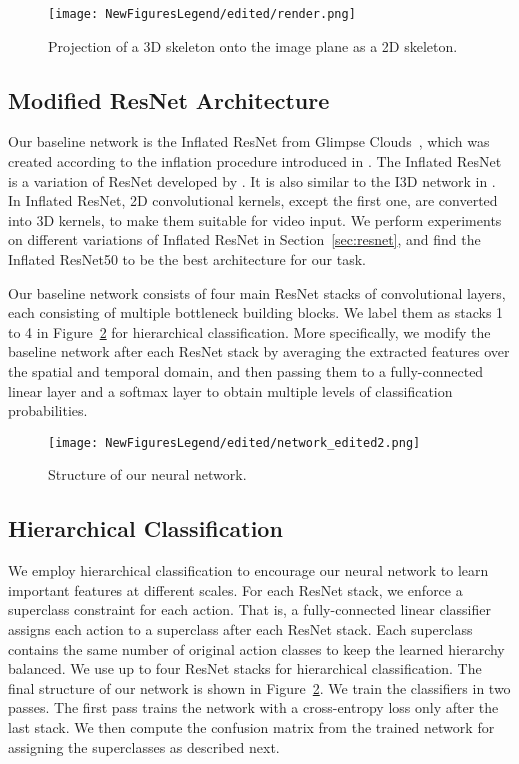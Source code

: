 \documentclass{article}
\begin{document}
 

 

\begin{figure}[tb]
\centering
\texttt{[image: NewFiguresLegend/edited/render.png]}
\caption{Projection of a 3D skeleton onto the image plane as a 2D skeleton.}
\label{fig:projection}
\end{figure}

\subsection{Modified ResNet Architecture}
\label{sec:network}

{Our baseline network is the Inflated ResNet from Glimpse Clouds~\cite{Baradel_2018}, which was created according to the inflation procedure introduced in \cite{carreira2017quo}. The Inflated ResNet is a variation of ResNet developed by \cite{He_2016}. It is also similar to the I3D network in \cite{zhu2018action}. In Inflated ResNet, 2D convolutional kernels, except the first one, are converted into 3D kernels, to make them suitable for video input. We perform experiments on different variations of Inflated ResNet in Section~\ref{sec:resnet}, and find the Inflated ResNet50 to be the best architecture for our task.} 





{Our baseline network consists of four main ResNet stacks of convolutional layers, each consisting of multiple bottleneck building blocks. We label them as stacks 1 to 4 in Figure~\ref{fig:network} for hierarchical classification. More specifically, we modify the baseline network after each ResNet stack by averaging the extracted features over the spatial and temporal domain, and then passing them to a fully-connected linear layer and a softmax layer to obtain multiple levels of classification probabilities.} 



\begin{figure}[tb]
\centering
\texttt{[image: NewFiguresLegend/edited/network\_edited2.png]}
\caption{Structure of our neural network.}
\label{fig:network}
\end{figure}

\subsection{Hierarchical Classification}
\label{sec:hierarchy}
{We employ hierarchical classification to encourage our neural network to learn important features at different scales. For each ResNet stack, we enforce a superclass constraint for each action. That is, a fully-connected linear classifier assigns each action to a superclass after each ResNet stack. Each superclass contains the same number of original action classes to keep the learned hierarchy balanced. We use up to four ResNet stacks for hierarchical classification. The final structure of our network is shown in Figure~\ref{fig:network}. We train the classifiers in two passes. The first pass trains the network with a cross-entropy loss only after the last stack. We then compute the confusion matrix  from the trained network for assigning the superclasses as described next. }
\end{document}
